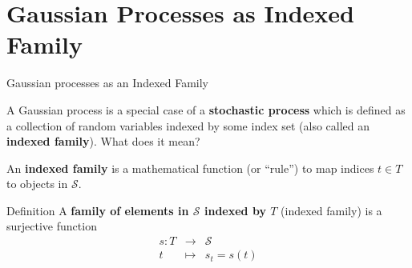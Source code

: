 \section{Gaussian Processes as Indexed Family}




\begin{vbframe}{Gaussian processes as an Indexed Family}



A Gaussian process is a special case of a \textbf{stochastic process} which is defined as a collection of random variables indexed by some index set (also called an \textbf{indexed family}). What does it mean? 

\lz 

An \textbf{indexed family} is a mathematical function (or \enquote{rule}) to map indices $t \in T$ to objects in $\mathcal{S}$. 

\begin{block}{Definition}
A \textbf{family of elements in $\mathcal{S}$ indexed by $T$} (indexed family) is a surjective function 
\vspace*{-0.3cm}
\begin{eqnarray*}
s: T &\to& \mathcal{S} \\
   t &\mapsto& s_t = s(t) 
\end{eqnarray*}
\end{block}

\end{vbframe}

